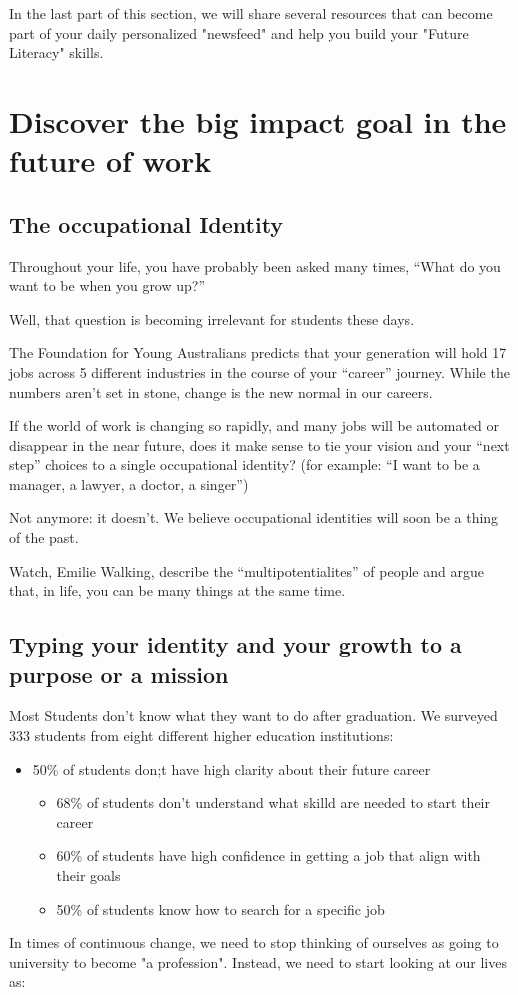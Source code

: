 \documentclass[11pt]{book} %
\begin{document}
		In the last part of this section, we will share several resources that can become part of your daily personalized "newsfeed" and help you build your "Future Literacy" skills. 
		
\chapter{Discover the big impact goal in the future of work}
	\section{The occupational Identity}
		Throughout your life, you have probably been asked many times, “What do you want to be when you grow up?” 

		Well, that question is becoming irrelevant for students these days. 

		The Foundation for Young Australians predicts that your generation will hold 17 jobs across 5 different industries in the course of your “career” journey. While the numbers aren't set in stone, change is the new normal in our careers. 

		If the world of work is changing so rapidly, and many jobs will be automated or disappear in the near future, does it make sense to tie your vision and your “next step” choices to a single occupational identity?  (for example: “I want to be a manager, a lawyer, a doctor, a singer”)

		Not anymore: it doesn’t. We believe occupational identities will soon be a thing of the past.

		Watch, Emilie Walking, describe the “multipotentialites” of people and argue that, in life, you can be many things at the same time.
	\section{Typing your identity and your growth to a purpose or a mission}
		Most Students don\rq{}t know what they want to do after graduation. We surveyed 333 students from eight different higher education institutions:
		\begin{itemize}
			\item 50\% of students don;t have high clarity about their future career
			\begin{itemize}
				\item 68\% of students don\rq{}t understand what skilld are needed to start their career
				\item 60\% of students have high confidence in getting a job that align with their goals
				\item 50\% of students know how to search for a specific job
			\end{itemize}
		\end{itemize}
		In times of continuous change, we need to stop thinking of ourselves as going to university to become "a profession". Instead, we need to start looking at our lives as: 
\end{document}
